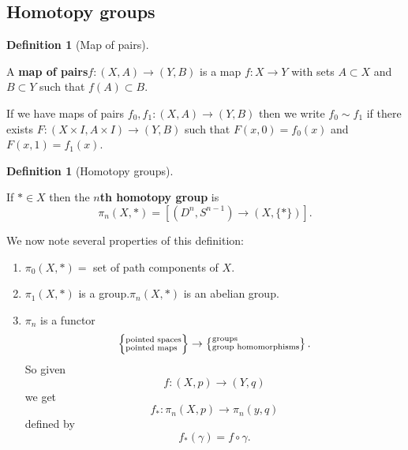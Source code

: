 \documentclass[10pt,]{article}
\newcommand{\terminology}[1]{\textbf{#1}}
\theoremstyle{plain}
\theoremstyle{definition}
\newtheorem{definition}[theorem]{Definition}
\begin{document}
\subsection[Homotopy groups]{Homotopy groups}\label{subsection-2}
\begin{definition}[Map of pairs]\label{definition-4}

                        A \terminology{map of pairs}\(f\colon (X, A) \to (Y, B)\) is a map \(f\colon X
                        \to Y\) with sets \(A\subset X\) and \(B\subset Y\) such that \(f(A)\subset
                        B\).

                        If we have maps of pairs \(f_0, f_1\colon (X,A) \to (Y,B)\) then we
                        write \(f_0\sim f_1\) if there exists \(F\colon(X\times I, A\times I) \to
                        (Y,B)\) such that \(F(x,0) = f_0(x)\) and \(F(x,1) = f_1(x)\).
                    \end{definition}
\begin{definition}[Homotopy groups]\label{definition-5}

                        If \(*\in X\) then the \terminology{\(n\)th homotopy group} is
                        \[\pi_n(X, *) = [(D^n, S^{n-1}) \to (X, \{*\})].\]\end{definition}

                    We now note several properties of this definition:
                    \begin{enumerate}
\item{}\(\pi_0(X, *) =\) set of path components of \(X\).\item{}\(\pi_1(X, *)\) is a group.\(\pi_n(X, *)\) is an abelian group. \item{}\(\pi_n\) is a functor
                            \[
                                \left\{ \begin{subarray}{l}\text{pointed spaces} \\ \text{pointed
                                maps} \end{subarray}\right\} \to \left\{\begin{subarray}{l}
                                \text{groups}\\ \text{group homomorphisms}\end{subarray}\right\}.
                            \]
                            So given
                            \[f\colon(X, p)\to(Y,q)\]
                            we get
                            \[f_*\colon \pi_n(X,p)\to\pi_n(y,q)\]
                            defined by
                            \[f_*(\gamma) = f\circ \gamma.\]
                            
                        \end{enumerate}
\end{document}
